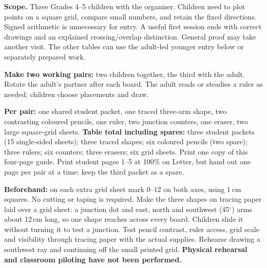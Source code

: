 \documentclass[11pt,letterpaper]{article}
\newcommand{\head}[1]{\par\vspace{4pt}{\large\bfseries #1}\par\vspace{1pt}}
\begin{document}
\head{Target table and preparation}
\textbf{Scope.} Three Grades 4--5 children with the organizer. Children need to plot points on a square grid, compare small numbers, and retain the fixed directions. Signed arithmetic is unnecessary for entry. A useful first session ends with correct drawings and an explained crossing/overlap distinction. General proof may take another visit. The other tables can use the adult-led younger entry below or separately prepared work.

\textbf{Make two working pairs:} two children together, the third with the adult. Rotate the adult's partner after each board. The adult reads or steadies a ruler as needed; children choose placements and draw.

\textbf{Per pair:} one shared student packet, one traced three-arm shape, two contrasting coloured pencils, one ruler, two junction counters, one eraser, two large square-grid sheets. \textbf{Table total including spares:} three student packets (15 single-sided sheets); three traced shapes; six coloured pencils (two spare); three rulers; six counters; three erasers; six grid sheets. Print one copy of this four-page guide. Print student pages 1--5 at 100\% on Letter, but hand out one page per pair at a time; keep the third packet as a spare.

\textbf{Beforehand:} on each extra grid sheet mark $0$--$12$ on both axes, using 1\,cm squares. No cutting or taping is required. Make the three shapes on tracing paper laid over a grid sheet: a junction dot and east, north and southwest (45$^\circ$) arms about 12\,cm long, so one shape reaches across every board. Children slide it without turning it to test a junction. Test pencil contrast, ruler access, grid scale and visibility through tracing paper with the actual supplies. Rehearse drawing a southwest ray and continuing off the small printed grid. \textbf{Physical rehearsal and classroom piloting have not been performed.}
\end{document}
